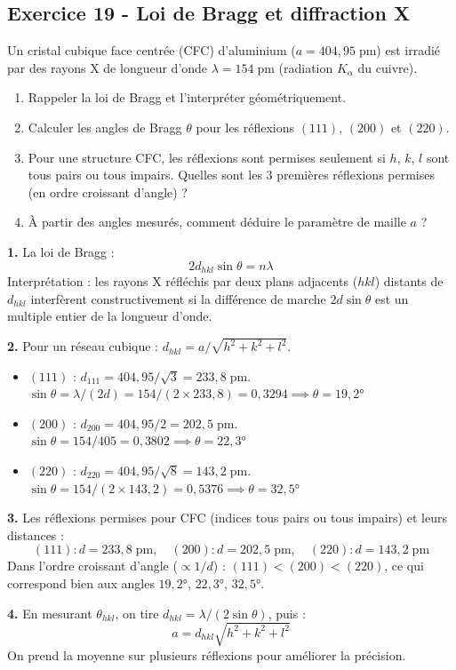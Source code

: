 \documentclass[12pt,a4paper]{article}
\begin{document}
\subsection*{Exercice 19 - Loi de Bragg et diffraction X \niveau{\moyen}}

\begin{boiteexercice}
Un cristal cubique face centrée (CFC) d'aluminium ($a=404{,}95\;\text{pm}$) est irradié par des rayons X de longueur d'onde $\lambda=154\;\text{pm}$ (radiation $K_\alpha$ du cuivre).
\begin{enumerate}
  \item Rappeler la loi de Bragg et l'interpréter géométriquement.
  \item Calculer les angles de Bragg $\theta$ pour les réflexions $(111)$, $(200)$ et $(220)$.
  \item Pour une structure CFC, les réflexions sont permises seulement si $h$, $k$, $l$ sont tous pairs ou tous impairs. Quelles sont les 3 premières réflexions permises (en ordre croissant d'angle) ?
  \item À partir des angles mesurés, comment déduire le paramètre de maille $a$ ?
\end{enumerate}
\end{boiteexercice}

\begin{boitecorrige}
\textbf{1.} La loi de Bragg :
\[
\boxed{2d_{hkl}\sin\theta = n\lambda}
\]
Interprétation : les rayons X réfléchis par deux plans adjacents ($hkl$) distants de $d_{hkl}$ interfèrent constructivement si la différence de marche $2d\sin\theta$ est un multiple entier de la longueur d'onde.

\textbf{2.} Pour un réseau cubique : $d_{hkl} = a/\sqrt{h^2+k^2+l^2}$.
\begin{itemize}[nosep]
  \item $(111)$ : $d_{111} = 404{,}95/\sqrt{3} = 233{,}8\;\text{pm}$. $\sin\theta = \lambda/(2d) = 154/(2\times233{,}8) = 0{,}3294 \implies \theta = 19{,}2°$
  \item $(200)$ : $d_{200} = 404{,}95/2 = 202{,}5\;\text{pm}$. $\sin\theta = 154/405 = 0{,}3802 \implies \theta = 22{,}3°$
  \item $(220)$ : $d_{220} = 404{,}95/\sqrt{8} = 143{,}2\;\text{pm}$. $\sin\theta = 154/(2\times143{,}2) = 0{,}5376 \implies \theta = 32{,}5°$
\end{itemize}

\textbf{3.} Les réflexions permises pour CFC (indices tous pairs ou tous impairs) et leurs distances :
\[
(111): d=233{,}8\;\text{pm}, \quad (200): d=202{,}5\;\text{pm}, \quad (220): d=143{,}2\;\text{pm}
\]
Dans l'ordre croissant d'angle ($\propto 1/d$) : $(111)<(200)<(220)$, ce qui correspond bien aux angles $19{,}2°$, $22{,}3°$, $32{,}5°$.

\textbf{4.} En mesurant $\theta_{hkl}$, on tire $d_{hkl} = \lambda/(2\sin\theta)$, puis :
\[
a = d_{hkl}\sqrt{h^2+k^2+l^2}
\]
On prend la moyenne sur plusieurs réflexions pour améliorer la précision.
\end{boitecorrige}
\end{document}
